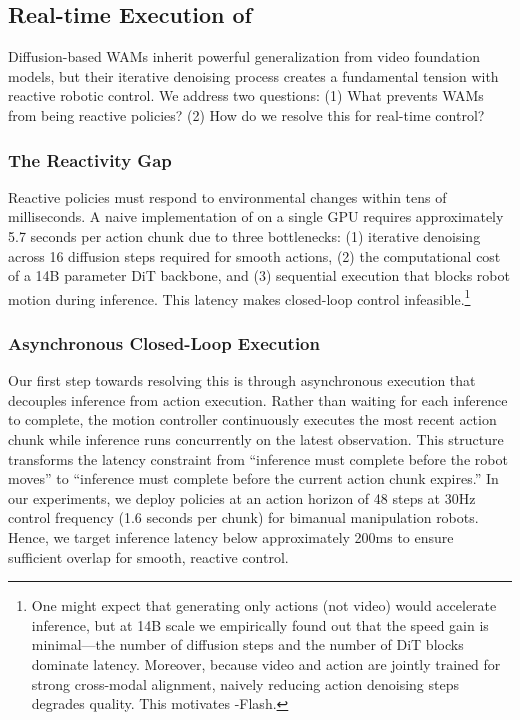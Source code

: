 \subsection{Real-time Execution of \ourmethod}
\label{subsec:realtime}

Diffusion-based WAMs inherit powerful generalization from video foundation models, but their iterative denoising process creates a fundamental tension with reactive robotic control. We address two questions: (1) What prevents WAMs from being reactive policies? (2) How do we resolve this for real-time control?

\subsubsection{The Reactivity Gap}

Reactive policies must respond to environmental changes within tens of milliseconds. A naive implementation of \ourmethod on a single GPU requires approximately 5.7 seconds per action chunk due to three bottlenecks: (1) iterative denoising across 16 diffusion steps required for smooth actions, (2) the computational cost of a 14B parameter DiT backbone, and (3) sequential execution that blocks robot motion during inference. This latency makes closed-loop control infeasible.\footnote{One might expect that generating only actions (not video) would accelerate inference, but at 14B scale we empirically found out that the speed gain is minimal—the number of diffusion steps and the number of DiT blocks dominate latency. Moreover, because video and action are jointly trained for strong cross-modal alignment, naively reducing action denoising steps degrades quality. This motivates \ourmethod-Flash.}

\subsubsection{Asynchronous Closed-Loop Execution}

Our first step towards resolving this is through asynchronous execution that decouples inference from action execution. Rather than waiting for each inference to complete, the motion controller continuously executes the most recent action chunk while inference runs concurrently on the latest observation. This structure transforms the latency constraint from ``inference must complete before the robot moves'' to ``inference must complete before the current action chunk expires.'' In our experiments, we deploy policies at an action horizon of 48 steps at 30Hz control frequency (1.6 seconds per chunk) for bimanual manipulation robots. Hence, we target inference latency below approximately 200ms to ensure sufficient overlap for smooth, reactive control.

